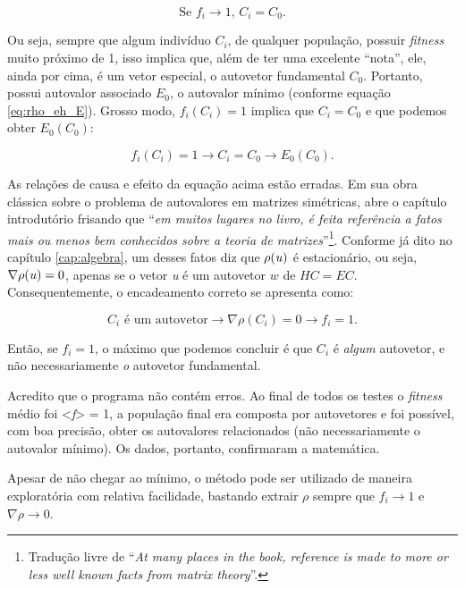 \begin{equation}\label{eq:afirmacaoErrada}
	\mbox{Se } f_i \rightarrow 1\mbox{, } C_i = C_0.
\end{equation}

Ou seja, sempre que algum indivíduo $C_i$, de qualquer população, possuir \textit{fitness} muito próximo de 1, isso implica que, além de ter uma excelente ``nota'', ele, ainda por cima, é um vetor especial, o autovetor fundamental $C_0$. Portanto, possui autovalor associado $E_0$, o autovalor mínimo (conforme equação \ref{eq:rho_eh_E}). Grosso modo, $f_i(C_i) = 1$ implica que $C_i = C_0$ e que podemos obter $E_0(C_0)$:

\begin{equation}\label{eq:causalidadeErrada}
	f_i(C_i) = 1 \rightarrow C_i = C_0 \rightarrow E_0(C_0).
\end{equation}

As relações de causa e efeito da equação acima estão erradas. Em sua obra clássica sobre o problema de autovalores em matrizes simétricas, \cite{Parlett1998} abre o capítulo introdutório frisando que ``\textit{em muitos lugares no livro, é feita referência a fatos mais ou menos bem conhecidos sobre a teoria de matrizes}''\footnote{Tradução livre de ``\textit{At many places in the book, reference is made to more or less well known facts from matrix theory}''.}. Conforme já dito no capítulo \ref{cap:algebra}, um desses fatos diz que $\rho(\mbox{\textit{u}})$ é estacionário, ou seja, $\nabla \rho(\mbox{\textit{u}}) = 0$, apenas se o vetor \textit{u} é um autovetor $w$ de $HC = EC$. Consequentemente, o encadeamento correto se apresenta como:

\begin{equation}\label{eq:causalidadeCorreta}
	C_i \mbox{ é um autovetor} \rightarrow \nabla \rho(C_i) = 0 \rightarrow f_i = 1.
\end{equation}
	
Então, se $f_i = 1$, o máximo que podemos concluir é que $C_i$ é \textit{algum} autovetor, e não necessariamente \textit{o} autovetor fundamental.

Acredito que o programa não contém erros. Ao final de todos os testes o \textit{fitness} médio foi <\textit{f}> = 1, a população final era composta por autovetores e foi possível, com boa precisão, obter os autovalores relacionados (não necessariamente o autovalor mínimo). Os dados, portanto, confirmaram a matemática.

Apesar de não chegar ao mínimo, o método pode ser utilizado de maneira exploratória com relativa facilidade, bastando extrair $\rho$ sempre que $f_i \rightarrow 1$ e $\nabla \rho \rightarrow 0$. 

